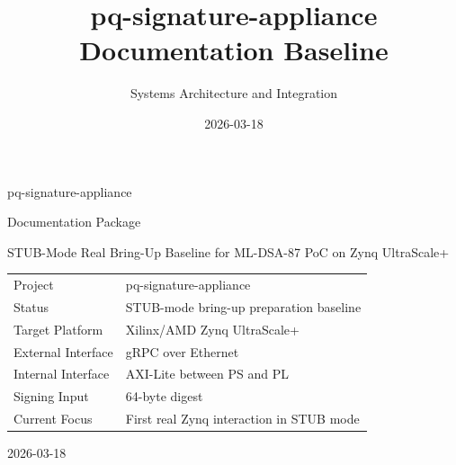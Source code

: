 \documentclass[11pt]{report}
\title{pq-signature-appliance\\Documentation Baseline}
\author{Systems Architecture and Integration}
\date{2026-03-18}
\begin{document}
\begin{titlepage}
  \centering
  {\Huge pq-signature-appliance\par}
  \vspace{1.2cm}
  {\Large Documentation Package\par}
  \vspace{0.8cm}
  {\large STUB-Mode Real Bring-Up Baseline for ML-DSA-87 PoC on Zynq UltraScale+\par}
  \vfill
  \begin{tabular}{ll}
    Project & pq-signature-appliance \\
    Status & STUB-mode bring-up preparation baseline \\
    Target Platform & Xilinx/AMD Zynq UltraScale+ \\
    External Interface & gRPC over Ethernet \\
    Internal Interface & AXI-Lite between PS and PL \\
    Signing Input & 64-byte digest \\
    Current Focus & First real Zynq interaction in STUB mode \\
  \end{tabular}
  \vfill
  {\large 2026-03-18\par}
\end{titlepage}

\tableofcontents
\clearpage

















\end{document}
